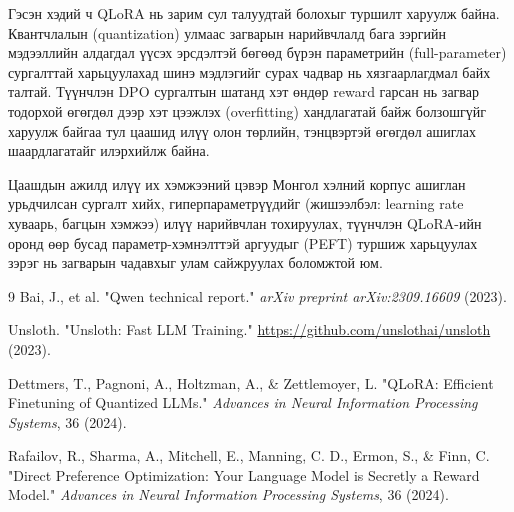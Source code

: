 \documentclass[a4paper,10pt,twocolumn]{article}
\begin{document}
	Гэсэн хэдий ч QLoRA нь зарим сул талуудтай болохыг туршилт харуулж байна. Квантчлалын (quantization) улмаас загварын нарийвчлалд бага зэргийн мэдээллийн алдагдал үүсэх эрсдэлтэй бөгөөд бүрэн параметрийн (full-parameter) сургалттай харьцуулахад шинэ мэдлэгийг сурах чадвар нь хязгаарлагдмал байх талтай. Түүнчлэн DPO сургалтын шатанд хэт өндөр reward гарсан нь загвар тодорхой өгөгдөл дээр хэт цээжлэх (overfitting) хандлагатай байж болзошгүйг харуулж байгаа тул цаашид илүү олон төрлийн, тэнцвэртэй өгөгдөл ашиглах шаардлагатайг илэрхийлж байна.
	
	Цаашдын ажилд илүү их хэмжээний цэвэр Монгол хэлний корпус ашиглан урьдчилсан сургалт хийх, гиперпараметрүүдийг (жишээлбэл: learning rate хуваарь, багцын хэмжээ) илүү нарийвчлан тохируулах, түүнчлэн QLoRA-ийн оронд өөр бусад параметр-хэмнэлттэй аргуудыг (PEFT) туршиж харьцуулах зэрэг нь загварын чадавхыг улам сайжруулах боломжтой юм.
	
	\renewcommand{\refname}{Ашигласан материал}
	
	\begin{thebibliography}{9}
		Bai, J., et al. "Qwen technical report." \textit{arXiv preprint arXiv:2309.16609} (2023).
		
		Unsloth. "Unsloth: Fast LLM Training." \url{https://github.com/unslothai/unsloth} (2023).
		
		Dettmers, T., Pagnoni, A., Holtzman, A., \& Zettlemoyer, L. "QLoRA: Efficient Finetuning of Quantized LLMs." \textit{Advances in Neural Information Processing Systems}, 36 (2024).
		
		Rafailov, R., Sharma, A., Mitchell, E., Manning, C. D., Ermon, S., \& Finn, C. "Direct Preference Optimization: Your Language Model is Secretly a Reward Model." \textit{Advances in Neural Information Processing Systems}, 36 (2024).
	\end{thebibliography}
\end{document}
